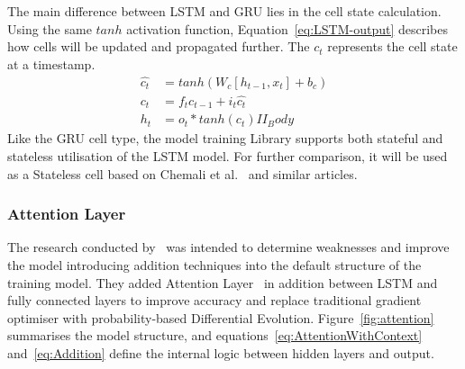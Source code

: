 The main difference between LSTM and GRU lies in the cell state calculation.
Using the same $tanh$ activation function, Equation~\ref{eq:LSTM-output} describes how cells will be updated and propagated further.
The $c_t$ represents the cell state at a timestamp.
\begin{equation}
    \begin{split}
        \hat{c_t} &= tanh \left(W_c \left[h_{t-1}, x_t \right] + b_c \right) \\
              c_t &= f_t c_{t-1}+i_t \hat{c_t} \\
              h_t &= o_t*tanh \left(c_t \right)II_Body
    \end{split}
    \label{eq:LSTM-output}
\end{equation}
Like the GRU cell type, the model training Library supports both stateful and stateless utilisation of the LSTM model.
For further comparison, it will be used as a Stateless cell based on Chemali et al.~\cite{Chemali2017} and similar articles.
%
%
\subsubsection{Attention Layer}
The research conducted by~\cite{mamo_long_2020} was intended to determine weaknesses and improve the model introducing addition techniques into the default structure of the training model.
They added Attention Layer~\cite{yang_hierarchical_2016} in addition between LSTM and fully connected layers to improve accuracy and replace traditional gradient optimiser with probability-based Differential Evolution.
Figure~\ref{fig:attention} summarises the model structure, and equations~\ref{eq:AttentionWithContext} and~\ref{eq:Addition} define the internal logic between hidden layers and output.

